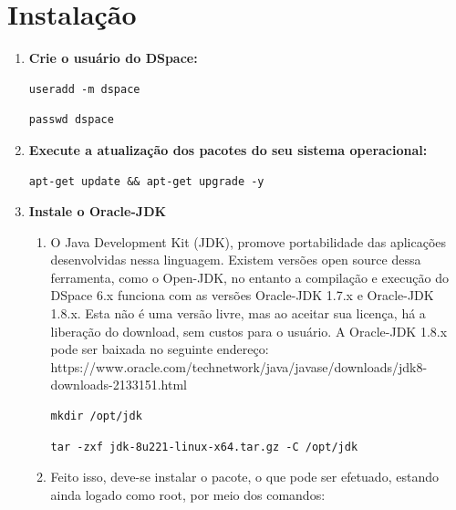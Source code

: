 \documentclass[12pt,hidelinks]{article}
\begin{document}
\section{Instalação}
\newpage
\begin{enumerate}
    
    \item \textbf{Crie o usuário do DSpace:} 
    
        \begin{verbatim}
useradd -m dspace
        \end{verbatim}
    
        \begin{verbatim}
passwd dspace
        \end{verbatim}
    
   
    \item \textbf{Execute a atualização dos pacotes do seu sistema operacional:} 
    
        \begin{verbatim}
apt-get update && apt-get upgrade -y
        \end{verbatim}
   
    \item \textbf{Instale o Oracle-JDK}
        \begin{enumerate}
            \item O Java Development Kit (JDK), promove portabilidade das aplicações desenvolvidas nessa linguagem. Existem versões open source dessa ferramenta, como o Open-JDK, no entanto a compilação e execução do DSpace 6.x funciona com as versões Oracle-JDK 1.7.x e Oracle-JDK 1.8.x. Esta não é uma versão livre, mas ao aceitar sua licença, há a liberação do download, sem custos para o usuário. A Oracle-JDK 1.8.x pode ser baixada no seguinte endereço:
            \singlespacing
            https://www.oracle.com/technetwork/java/javase/downloads/jdk8-downloads-2133151.html
            
            \begin{verbatim}
mkdir /opt/jdk
        \end{verbatim}
        
        \begin{verbatim}
tar -zxf jdk-8u221-linux-x64.tar.gz -C /opt/jdk
        \end{verbatim}
        
        \item Feito isso, deve-se instalar o pacote, o que pode ser efetuado, estando ainda logado como root, por meio dos comandos:
        

\end{enumerate}
\end{enumerate}
\end{document}

